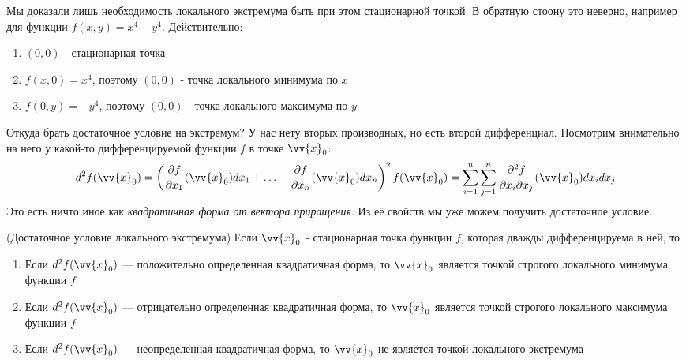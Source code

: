 \begin{example}
	Мы доказали лишь необходимость локального экстремума быть при этом стационарной точкой. В обратную стоону это неверно, например для функции $f(x, y) = x^4 - y^4$. Действительно:
	\begin{enumerate}
		\item $(0, 0)$ - стационарная точка
		
		\item $f(x, 0) = x^4$, поэтому $(0, 0)$ - точка локального минимума по $x$
		
		\item $f(0, y) = -y^4$, поэтому $(0, 0)$ - точка локального максимума по $y$
	\end{enumerate}
\end{example}

\begin{note}
	Откуда брать достаточное условие на экстремум? У нас нету вторых производных, но есть второй дифференциал. Посмотрим внимательно на него у какой-то дифференцируемой функции $f$ в точке $\vv{x}_0$:
	\[
		d^2f(\vv{x}_0) = \ps{\pd{f}{x_1}(\vv{x}_0)dx_1 + \ldots + \pd{f}{x_n}(\vv{x}_0)dx_n}^2 f(\vv{x}_0) = \sum_{i = 1}^n \sum_{j = 1}^n \pd{^2 f}{x_i \vdelta x_j}(\vv{x}_0) dx_i dx_j
	\]
	Это есть ничто иное как \textit{квадратичная форма от вектора приращения}. Из её свойств мы уже можем получить достаточное условие.
\end{note}

\begin{theorem} (Достаточное условие локального экстремума)
	Если $\vv{x}_0$ - стационарная точка функции $f$, которая дважды дифференцируема в ней, то
	\begin{enumerate}
		\item Если $d^2f(\vv{x}_0)$ --- положительно определенная квадратичная форма, то $\vv{x}_0$ является точкой строгого локального минимума функции $f$
		
		\item Если $d^2f(\vv{x}_0)$ --- отрицательно определенная квадратичная форма, то $\vv{x}_0$ является точкой строгого локального максимума функции $f$
		
		\item Если $d^2f(\vv{x}_0)$ --- неопределенная квадратичная форма, то $\vv{x}_0$ не является точкой локального экстремума
	\end{enumerate}
\end{theorem}

